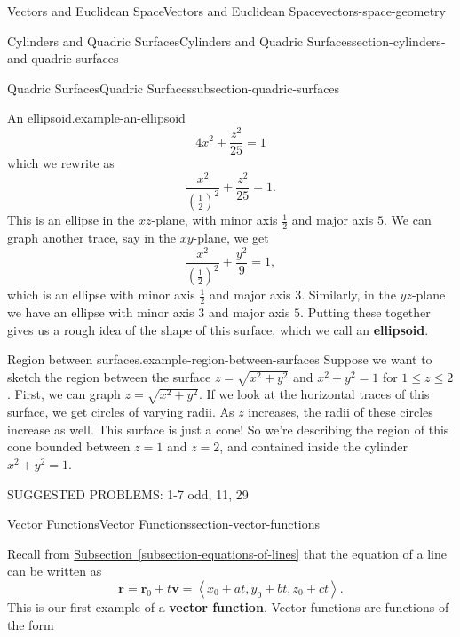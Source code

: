 \documentclass[oneside,10pt,]{book}
\newcommand{\terminology}[1]{\textbf{#1}}
\numberwithin{equation}{section}
\newcommand{\vv}[1]{\mathbf{#1}}
\newcommand{\dotprod}[1]{\left\langle #1 \right\rangle}
\begin{document}
\begin{chapterptx}{Vectors and Euclidean Space}{}{Vectors and Euclidean Space}{}{}{vectors-space-geometry}
\begin{sectionptx}{Cylinders and Quadric Surfaces}{}{Cylinders and Quadric Surfaces}{}{}{section-cylinders-and-quadric-surfaces}
\begin{subsectionptx}{Quadric Surfaces}{}{Quadric Surfaces}{}{}{subsection-quadric-surfaces}
\begin{example}{An ellipsoid.}{example-an-ellipsoid}
\begin{equation*}
4x^{2}+\frac{z^{2}}{25} = 1
\end{equation*}
\hypertarget{p-1245}{}%
which we rewrite as%
%
\begin{equation*}
\frac{x^{2}}{(\frac{1}{2})^{2}}+\frac{z^{2}}{25} = 1.
\end{equation*}
\hypertarget{p-1246}{}%
This is an ellipse in the \(xz\)-plane, with minor axis \(\frac{1}{2}\) and major axis \(5\). We can graph another trace, say in the \(xy\)-plane, we get%
%
\begin{equation*}
\frac{x^{2}}{(\frac{1}{2})^{2}}+\frac{y^{2}}{9} = 1,
\end{equation*}
\hypertarget{p-1247}{}%
which is an ellipse with minor axis \(\frac{1}{2}\) and major axis \(3\). Similarly, in the \(yz\)-plane we have an ellipse with minor axis \(3\) and major axis \(5\). Putting these together gives us a rough idea of the shape of this surface, which we call an \terminology{ellipsoid}.%
\end{example}
\begin{example}{Region between surfaces.}{example-region-between-surfaces}%
\hypertarget{p-1248}{}%
Suppose we want to sketch the region between the surface \(z=\sqrt{x^{2}+y^{2}}\) and \(x^{2}+y^{2}=1\) for \(1\leq z\leq 2\). First, we can graph \(z=\sqrt{x^{2}+y^{2}}\). If we look at the horizontal traces of this surface, we get circles of varying radii. As \(z\) increases, the radii of these circles increase as well. This surface is just a cone! So we're describing the region of this cone bounded between \(z=1\) and \(z=2\), and contained inside the cylinder \(x^{2}+y^{2}=1\).%
\end{example}
\hypertarget{p-1249}{}%
SUGGESTED PROBLEMS: 1-7 odd, 11, 29%
\end{subsectionptx}
\end{sectionptx}
%
%
\typeout{************************************************}
\typeout{************************************************}
%
\begin{sectionptx}{Vector Functions}{}{Vector Functions}{}{}{section-vector-functions}
\begin{introduction}{}%
\hypertarget{p-1250}{}%
Recall from \hyperref[subsection-equations-of-lines]{Subsection~\ref{subsection-equations-of-lines}} that the equation of a line can be written as%
\begin{equation*}
\vv{r} = \vv{r}_{0}+t\vv{v} = \dotprod{x_{0}+at, y_{0}+bt, z_{0}+ct}.
\end{equation*}
This is our first example of a \terminology{vector function}. Vector functions are functions of the form%

\end{introduction}
\end{sectionptx}
\end{chapterptx}
\end{document}
